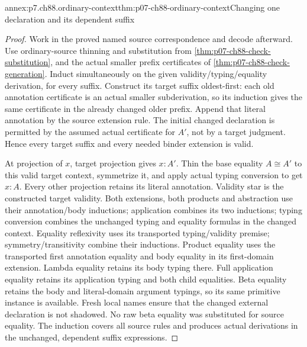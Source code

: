 \begin{annexitem}{annex:p7.ch88.ordinary-context}{thm:p07-ch88-ordinary-context}{Changing one declaration and its dependent suffix}
\begin{proof}
Work in the proved named source correspondence and decode afterward.
Use ordinary-source thinning and substitution from
\cref{thm:p07-ch88-check-substitution}, and the actual smaller prefix
certificates of \cref{thm:p07-ch88-check-generation}.
Induct simultaneously on the given validity/typing/equality derivation,
for every suffix. Construct its target suffix oldest-first: each old
annotation certificate is an actual smaller subderivation, so its
induction gives the same certificate in the already changed older
prefix. Append that literal annotation by the source extension rule.
The initial changed declaration is permitted by the assumed actual
certificate for \(A'\), not by a target judgment. Hence every target
suffix and every needed binder extension is valid.

At projection of \(x\), target projection gives \(x:A'\).
Thin the base equality \(A\cong A'\) to this valid target context,
symmetrize it, and apply actual typing conversion to get \(x:A\).
Every other projection retains its literal annotation. Validity star
is the constructed target validity. Both extensions, both products
and abstraction use their annotation/body inductions; application
combines its two inductions; typing conversion combines the unchanged
typing and equality formulas in the changed context.
Equality reflexivity uses its transported typing/validity premise;
symmetry/transitivity combine their inductions. Product equality uses
the transported first annotation equality and body equality in its
first-domain extension. Lambda equality retains its body typing there.
Full application equality retains its application typing and both
child equalities. Beta equality retains the body and literal-domain
argument typings, so its same primitive instance is available.
Fresh local names ensure that the changed external declaration is
not shadowed. No raw beta equality was substituted for source equality.
The induction covers all source rules and produces actual derivations
in the unchanged, dependent suffix expressions.
\end{proof}
\end{annexitem}

